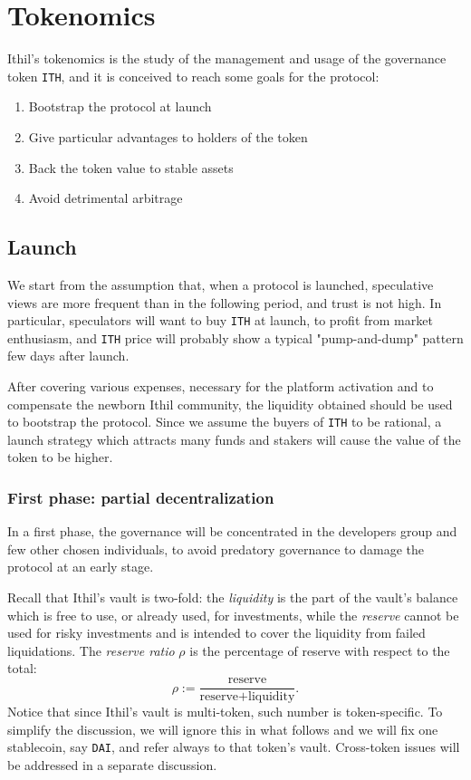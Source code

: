 \documentclass[a4paper,10 pt]{article}
\theoremstyle{definition}
\begin{document}
\section{Tokenomics}
Ithil's tokenomics is the study of the management and usage of the governance token \verb|ITH|, and it is conceived to reach some goals for the protocol:
\begin{enumerate}
\item Bootstrap the protocol at launch
\item Give particular advantages to holders of the token
\item Back the token value to stable assets
\item Avoid detrimental arbitrage
\end{enumerate}

\subsection{Launch}\label{launch}

We start from the assumption that, when a protocol is launched, speculative views are more frequent than in the following period, and trust is not high. In particular, speculators will want to buy \verb|ITH| at launch, to profit from market enthusiasm, and \verb|ITH| price will probably show a typical "pump-and-dump" pattern few days after launch.

After covering various expenses, necessary for the platform activation and to compensate the newborn Ithil community, the liquidity obtained should be used to bootstrap the protocol. Since we assume the buyers of \verb|ITH| to be rational, a launch strategy which attracts many funds and stakers will cause the value of the token to be higher.

\subsubsection{First phase: partial decentralization}
In a first phase, the governance will be concentrated in the developers group and few other chosen individuals, to avoid predatory governance to damage the protocol at an early stage.

Recall that Ithil's vault is two-fold: the {\it liquidity} is the part of the vault's balance which is free to use, or already used, for investments, while the {\it reserve} cannot be used for risky investments and is intended to cover the liquidity from failed liquidations. The {\it reserve ratio} $\rho$ is the percentage of reserve with respect to the total:
$$\rho := \frac{\text{reserve}}{\text{reserve} + \text{liquidity}}.$$
Notice that since Ithil's vault is multi-token, such number is token-specific. To simplify the discussion, we will ignore this in what follows and we will fix one stablecoin, say \verb|DAI|, and refer always to that token's vault. Cross-token issues will be addressed in a separate discussion.
\end{document}
